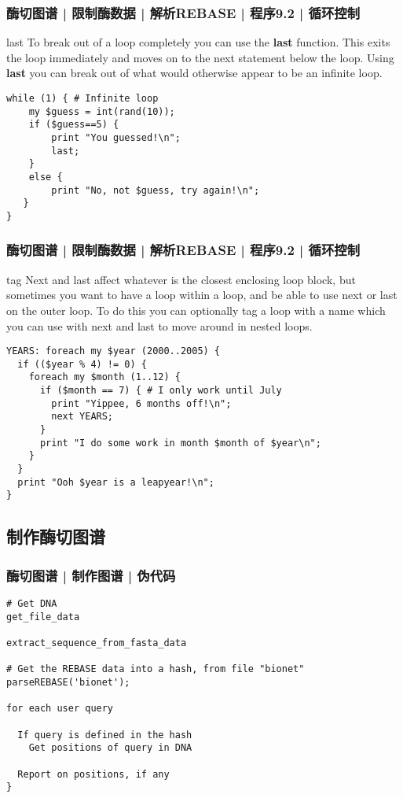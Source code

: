 \begin{frame}[fragile]
  \frametitle{酶切图谱 | 限制酶数据 | 解析REBASE | 程序9.2 | 循环控制}
  \begin{block}{last}
    {\small To break out of a loop completely you can use the \textbf{last} function. This exits the loop immediately and moves on to the next statement below the loop. Using \textbf{last} you can break out of what would otherwise appear to be an infinite loop.}
  \end{block}
  \vspace{-0.5em}
  \pause
\begin{lstlisting}
while (1) { # Infinite loop
    my $guess = int(rand(10));
    if ($guess==5) {
        print "You guessed!\n";
        last;
    }
    else {
        print "No, not $guess, try again!\n";
   }
}
\end{lstlisting}
\end{frame}

\begin{frame}[fragile]
  \frametitle{酶切图谱 | 限制酶数据 | 解析REBASE | 程序9.2 | 循环控制}
  \begin{block}{tag}
    {\footnotesize Next and last affect whatever is the closest enclosing loop block, but sometimes you want to have a loop within a loop, and be able to use next or last on the outer loop. To do this you can optionally tag a loop with a name which you can use with next and last to move around in nested loops.}
  \end{block}
  \vspace{-1em}
  \pause
\begin{lstlisting}[basicstyle=\footnotesize\tt,numberstyle=\scriptsize]
YEARS: foreach my $year (2000..2005) {
  if (($year % 4) != 0) {
    foreach my $month (1..12) {
      if ($month == 7) { # I only work until July
        print "Yippee, 6 months off!\n";
        next YEARS;
      }
      print "I do some work in month $month of $year\n";
    }
  }
  print "Ooh $year is a leapyear!\n";
}
\end{lstlisting}
\end{frame}

\subsection{制作酶切图谱}
\begin{frame}[fragile]
  \frametitle{酶切图谱 | 制作图谱 | 伪代码}
  \vspace{-0.6em}
\begin{lstlisting}
# Get DNA
get_file_data

extract_sequence_from_fasta_data

# Get the REBASE data into a hash, from file "bionet"
parseREBASE('bionet');

for each user query

  If query is defined in the hash
    Get positions of query in DNA

  Report on positions, if any
}
\end{lstlisting}
\end{frame}

